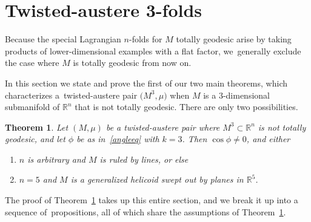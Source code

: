 \documentclass[10pt,a4paper]{amsart}
\def\R{\mathbb{R}}
\newtheorem{Theorem}{Theorem}[section]
\numberwithin{equation}{section}
\begin{document}
\section{Twisted-austere 3-folds} \label{sec:tw3folds}

Because the special Lagrangian $n$-folds for $M$ totally geodesic arise by taking products of lower-dimensional examples with a flat factor, we~generally exclude the case where $M$ is totally geodesic from now on.

In this section we state and prove the first of our two main theorems, which characterizes a~twisted-austere pair $\big(M^3, \mu\big)$ when $M$ is a $3$-dimensional submanifold of $\R^n$ that is not totally geodesic. There are only two possibilities.


\begin{Theorem} \label{theoremone}
Let $(M,\mu)$ be a twisted-austere pair where $M^3 \subset \R^n$ is \emph{not totally geodesic}, and let $\phi$ be as in~\eqref{angleeq} with $k=3$.
Then $\cos \phi \ne 0$, and either
\begin{enumerate}[$(i)$]\itemsep=0pt
\item $n$ is arbitrary and $M$ is {ruled by lines}, or else
\item $n=5$ and $M$ is a {generalized helicoid swept out by planes in $\R^5$}.
\end{enumerate}
\end{Theorem}



The proof of Theorem~\ref{theoremone} takes up this entire section, and we break it up into a sequence of~pro\-positions, all of which share the assumptions of Theorem~\ref{theoremone}.
\end{document}
